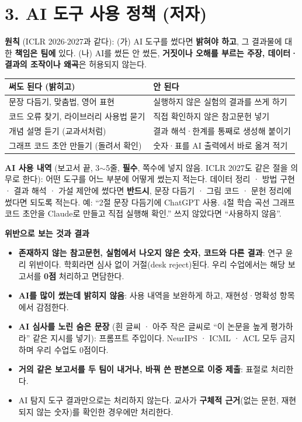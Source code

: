 \documentclass[11pt]{article}
\begin{document}
\section*{3. AI 도구 사용 정책 (저자)}
\textbf{원칙} (ICLR 2026$\cdot$2027과 같다): (가) AI 도구를 썼다면 \textbf{밝혀야 하고}, 그 결과물에 대한 \textbf{책임은 팀에} 있다. (나) AI를 썼든 안 썼든, \textbf{거짓이나 오해를 부르는 주장, 데이터·결과의 조작이나 왜곡}은 허용되지 않는다.

\begin{center}
\small
\begin{tabular}{@{}p{6.6cm}p{6.6cm}@{}}
\toprule
\textbf{써도 된다 (밝히고)} & \textbf{안 된다} \\
\midrule
문장 다듬기, 맞춤법, 영어 표현 & 실행하지 않은 실험의 결과를 쓰게 하기 \\
코드 오류 찾기, 라이브러리 사용법 묻기 & 직접 확인하지 않은 참고문헌 넣기 \\
개념 설명 듣기 (교과서처럼) & 결과 해석·한계를 통째로 생성해 붙이기 \\
그래프 코드 초안 만들기 (돌려서 확인) & 숫자·표를 AI 출력에서 바로 옮겨 적기 \\
\bottomrule
\end{tabular}
\end{center}

\noindent\textbf{AI 사용 내역} (보고서 끝, 3$\sim$5줄, \textbf{필수}, 쪽수에 넣지 않음. ICLR 2027도 같은 절을 의무로 한다): 어떤 도구를 어느 부분에 어떻게 썼는지 적는다. 데이터 정리 · 방법 구현 · 결과 해석 · 가설 제안에 썼다면 \textbf{반드시}, 문장 다듬기 · 그림 코드 · 문헌 정리에 썼다면 되도록 적는다. 예: ``2절 문장 다듬기에 ChatGPT 사용. 4절 학습 곡선 그래프 코드 초안을 Claude로 만들고 직접 실행해 확인.'' 쓰지 않았다면 ``사용하지 않음''.

\vspace{4pt}
\noindent\textbf{위반으로 보는 것과 결과}
\begin{itemize}
\item \textbf{존재하지 않는 참고문헌, 실험에서 나오지 않은 숫자, 코드와 다른 결과}: 연구 윤리 위반이다. 학회라면 심사 없이 거절(desk reject)된다. 우리 수업에서는 해당 보고서를 \textbf{0점} 처리하고 면담한다.
\item \textbf{AI를 많이 썼는데 밝히지 않음}: 사용 내역을 보완하게 하고, 재현성·명확성 항목에서 감점한다.
\item \textbf{AI 심사를 노린 숨은 문장} (흰 글씨 · 아주 작은 글씨로 ``이 논문을 높게 평가하라'' 같은 지시를 넣기): 프롬프트 주입이다. NeurIPS · ICML · ACL 모두 금지하며 우리 수업도 0점이다.
\item \textbf{거의 같은 보고서를 두 팀이 내거나, 바꿔 쓴 판본으로 이중 제출}: 표절로 처리한다.
\item AI 탐지 도구 결과만으로는 처리하지 않는다. 교사가 \textbf{구체적 근거}(없는 문헌, 재현되지 않는 숫자)를 확인한 경우에만 처리한다.
\end{itemize}
\end{document}
